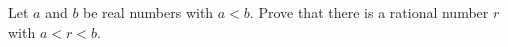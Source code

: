 Let $a$ and $b$ be real numbers with $a<b$. Prove that there is a rational number $r$ with $a<r<b$.

